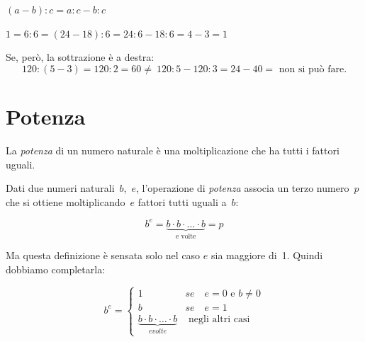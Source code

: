 \vspace{.5em}
\begin{minipage}{.38\textwidth}
 \((a-b):c=a:c-b:c\)
\end{minipage}
\hfill
\begin{minipage}{.58\textwidth}
 \(1 = 6 : 6 = (24-18) : 6 = 24 : 6 - 18 : 6 = 4 - 3 = 1\)
\end{minipage}

Se, però, la sottrazione è a destra:
\[120:(5-3)=120:2=60\neq~120:5-120:3=24-40=\text{ non si può fare.}\]


\section{Potenza}
\label{sec:01_potenza}

La \emph{potenza} di un numero naturale è una moltiplicazione che ha tutti 
i fattori uguali.

\begin{definizione}
Dati due numeri naturali~\(b\),~\(e\), l'operazione di \emph{potenza} 
associa un terzo numero~\(p\) che si ottiene moltiplicando~\(e\) fattori tutti 
uguali a~\(b\):
\begin{inaccessibleblock}[
  \[b^e = \mbox{e volte}{b \cdot b \cdot  \dots  \cdot b} = p\]
  ]
\[b^e = \underbrace{b \cdot b \cdot \dots \cdot b}_{\text{e volte}} = p\]
\end{inaccessibleblock}

\end{definizione}

Ma questa definizione è sensata solo nel caso \(e\) sia maggiore di~1.
Quindi dobbiamo completarla:

\begin{inaccessibleblock}[
  \begin{definizione}
    \[
    b^e = \begin{cases}
    1 & se \quad e = 0 \text{ e } b\neq 0\\
    b & se \quad e = 1\\
    \mbox{e volte}{b \cdot b \cdot \dots \cdot b} & \mbox{ 
negli altri casi}
    \end{cases}\]
  \end{definizione}
  ]
  \begin{definizione}
    \[
    b^e = \begin{cases}
    1 & se \quad e = 0 \text{ e } b\neq 0\\
    b & se \quad e = 1\\
    \underbrace{b \cdot b \cdot \dots \cdot b}_{e volte} & 
\text{ negli altri casi}
    \end{cases}\]
  \end{definizione}
\end{inaccessibleblock}


